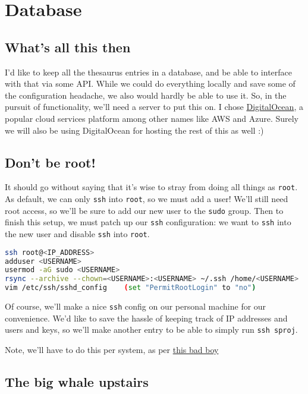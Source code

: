 \documentclass[11pt, twoside, reqno]{book}
\begin{document}
\chapter{Database}



\section{What's all this then}

I'd like to keep all the thesaurus entries in a database, and be able to interface with that via some API. While we could do everything locally and save some of the configuration headache, we also would hardly be able to use it. So, in the pursuit of functionality, we'll need a server to put this on. I chose \href{https://www.digitalocean.com}{DigitalOcean}, a popular cloud services platform among other names like AWS and Azure. Surely we will also be using DigitalOcean for hosting the rest of this as well :)

\section{Don't be root!}

It should go without saying that it's wise to stray from doing all things as \texttt{root}. As default, we can only \texttt{ssh} into \texttt{root}, so we must add a user! We'll still need root access, so we'll be sure to add our new user to the \texttt{sudo} group. Then to finish this setup, we must patch up our \texttt{ssh} configuration: we want to \texttt{ssh} into the new user and disable \texttt{ssh} into \texttt{root}.
\begin{lstlisting}[language=sh]
ssh root@<IP_ADDRESS>
adduser <USERNAME>
usermod -aG sudo <USERNAME> 
rsync --archive --chown=<USERNAME>:<USERNAME> ~/.ssh /home/<USERNAME> 
vim /etc/ssh/sshd_config    (set "PermitRootLogin" to "no")
\end{lstlisting}

Of course, we'll make a nice \texttt{ssh} config on our personal machine for our convenience. We'd like to save the hassle of keeping track of IP addresses and users and keys, so we'll make another entry to be able to simply run \texttt{ssh sproj}.

Note, we'll have to do this per system, as per \href{https://www.digitalocean.com/community/questions/error-permission-denied-publickey-when-i-try-to-ssh}{this bad boy}

\section{The big whale upstairs}
\end{document}
